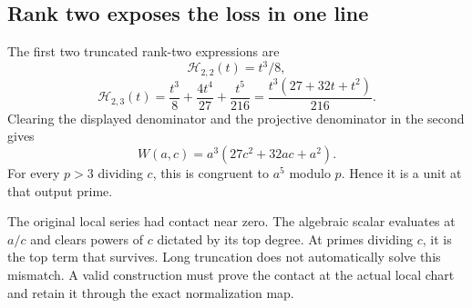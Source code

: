 \subsection{Rank two exposes the loss in one line}
The first two truncated rank-two expressions are
\[
 \mathcal H_{2,2}(t)=t^3/8,
\]
\[
 \mathcal H_{2,3}(t)=\frac{t^3}{8}+\frac{4t^4}{27}+\frac{t^5}{216}
 =\frac{t^3(27+32t+t^2)}{216}.
\]
Clearing the displayed denominator and the projective denominator in the second gives
\[
 W(a,c)=a^3(27c^2+32ac+a^2).
\]
For every $p>3$ dividing $c$, this is congruent to $a^5$ modulo $p$. Hence it is a unit at that output prime.

The original local series had contact near zero. The algebraic scalar evaluates at $a/c$ and clears powers of $c$ dictated by its top degree. At primes dividing $c$, it is the top term that survives. Long truncation does not automatically solve this mismatch. A valid construction must prove the contact at the actual local chart and retain it through the exact normalization map.

